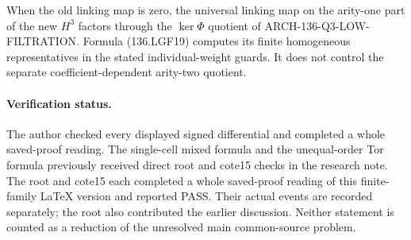 When the old linking map is zero, the universal linking map on
the arity-one part of the new \(H^3\) factors through the
\(\ker\Phi\) quotient of ARCH-136-Q3-LOW-FILTRATION.
Formula (136.LGF19) computes its finite homogeneous representatives
in the stated individual-weight guards. It does not control the
separate coefficient-dependent arity-two quotient.

\paragraph{Verification status.}
The author checked every displayed signed differential and completed
a whole saved-proof reading. The single-cell mixed formula and the
unequal-order Tor formula previously received direct root and cote15
checks in the research note. The root and cote15 each completed a whole saved-proof reading of
this finite-family LaTeX version and reported PASS. Their actual events
are recorded separately; the root also contributed the earlier discussion.
Neither statement is counted as a reduction of the unresolved main
common-source problem.
